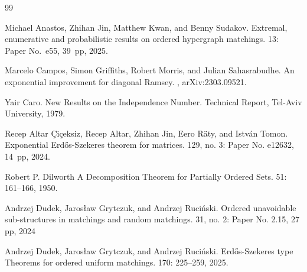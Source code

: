 \documentclass[10pt,a4paper]{amsart}
\theoremstyle{definition}
\begin{document}
%
\begin{thebibliography}{99}




Michael Anastos, Zhihan Jin, Matthew Kwan, and Benny Sudakov.
\newblock Extremal, enumerative and probabilistic results on ordered hypergraph matchings.
 13: Paper No.~e55, 39~pp, 2025.

Marcelo Campos, Simon Griffiths, Robert Morris, and Julian Sahasrabudhe. 
\newblock An exponential improvement for diagonal Ramsey.
, arXiv:2303.09521.

Yair Caro. 
\newblock New Results on the Independence Number.
\newblock Technical Report, Tel-Aviv University, 1979.

Recep Altar Çiçeksiz, Recep Altar, Zhihan Jin, Eero Räty, and István Tomon. 
\newblock Exponential Erd\H{o}s-Szekeres theorem for matrices.
 129, no. 3: Paper No. e12632, 14~pp, 2024.

Robert P. Dilworth 
\newblock A Decomposition Theorem for Partially Ordered Sets.
  51: 161--166, 1950.

Andrzej Dudek, Jarosław Grytczuk, and Andrzej Ruci\'{n}ski. 
\newblock Ordered unavoidable sub-structures in matchings and random matchings.
 31, no. 2: Paper No. 2.15, 27 pp, 2024

Andrzej Dudek, Jarosław Grytczuk, and Andrzej Ruci\'{n}ski. 
\newblock Erd\H{o}s-Szekeres type Theorems for ordered uniform matchings.
 170: 225--259, 2025.


\end{thebibliography}
\end{document}
